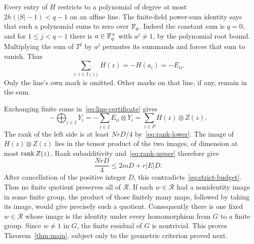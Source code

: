Every entry of $H$ restricts to a polynomial of degree at most $2h(|S|-1)<q-1$ on an affine line. The finite-field power-sum identity says that such a polynomial sums to zero over $\mathbb F_q$. Indeed the constant sum is $q=0$, and for $1\le j<q-1$ there is $a\in\mathbb F_q^\times$ with $a^j\ne1$, by the polynomial root bound. Multiplying the sum of $T^j$ by $a^j$ permutes its summands and forces that sum to vanish. Thus
\begin{equation}\label{eq:line-certificate}
 \sum_{z:\,i\in I(z)}H(z)=-H(a_i)=-E_{ii}.
\end{equation}
Only the line's own mark is omitted. Other marks on that line, if any, remain in the sum.

Exchanging finite sums in~\eqref{eq:line-certificate} gives
\begin{equation}\label{eq:tensor-certificate}
 -\bigoplus_{i\in I}Y_i
 =-\sum_{i\in I}E_{ii}\otimes Y_i
 =\sum_{z\in P}H(z)\otimes Z(z).
\end{equation}
The rank of the left side is at least $NrD/4$ by~\eqref{eq:rank-lower}. The image of $H(z)\otimes Z(z)$ lies in the tensor product of the two images, of dimension at most $\operatorname{rank} Z(z)$. Rank subadditivity and~\eqref{eq:rank-upper} therefore give
\[
 \frac{NrD}{4}\le 2mD+r|E|D.
\]
After cancellation of the positive integer $D$, this contradicts~\eqref{eq:strict-budget}.
Thus no finite quotient preserves all of
$\mathcal R$. If each $w\in\mathcal R$ had a nonidentity image in some
finite group, the product of those finitely many maps, followed by taking
its image, would give precisely such a quotient. Consequently there is
one fixed $w\in\mathcal R$ whose image is the identity under every
homomorphism from $G$ to a finite group. Since $w\ne1$ in $G$, the finite
residual of $G$ is nontrivial. This proves Theorem~\ref{thm:main}, subject
only to the geometric criterion proved next.
